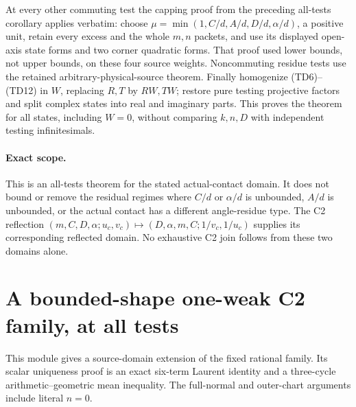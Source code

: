 At every other commuting test the capping proof from the preceding
all-tests corollary applies verbatim: choose
$\mu=\min(1,C/d,A/d,D/d,\alpha/d)$, a positive unit, retain every
excess and the whole $m,n$ packets, and use its displayed open-axis
state forms and two corner quadratic forms. That proof used lower
bounds, not upper bounds, on these four source weights. Noncommuting
residue tests use the retained arbitrary-physical-source theorem.
Finally homogenize (TD6)--(TD12) in $W$, replacing $R,T$ by $RW,TW$;
restore pure testing projective factors and split complex states into
real and imaginary parts. This proves the theorem for all states,
including $W=0$, without comparing $k,n,D$ with independent testing
infinitesimals.

\paragraph{Exact scope.}
This is an all-tests theorem for the stated actual-contact domain.
It does not bound or remove the residual regimes where $C/d$ or
$\alpha/d$ is unbounded, $A/d$ is unbounded, or the actual contact
has a different angle-residue type. The C2 reflection
$(m,C,D,\alpha;u_c,v_c)\mapsto(D,\alpha,m,C;1/v_c,1/u_c)$ supplies
its corresponding reflected domain. No exhaustive C2 join follows
from these two domains alone.


\section{\texorpdfstring{A bounded-shape one-weak C2 family, at all tests}{A bounded-shape one-weak C2 family, at all tests}}
\label{component:pec59340d644f}

\label{pec59340d644f:sec:c2-general-single-angle}

This module gives a source-domain extension of the fixed rational
family.  Its scalar uniqueness proof is an exact six-term Laurent
identity and a three-cycle arithmetic--geometric mean inequality.
The full-normal and outer-chart arguments include literal $n=0$.

